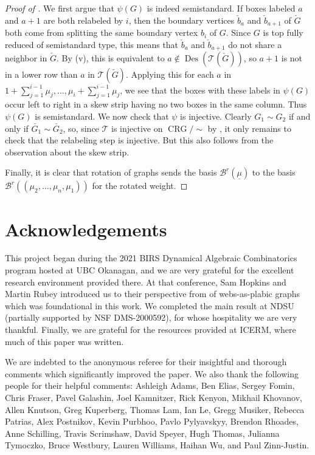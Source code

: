 \documentclass{amsart}
\theoremstyle{definition}
\theoremstyle{remark}
\numberwithin{equation}{section}
\DeclareMathOperator{\crg}{CRG}
\DeclareMathOperator{\Des}{Des}
\begin{document}
\begin{proof}[Proof of ]
    We first argue that $\psi(G)$ is indeed semistandard. If boxes labeled $a$ and $a+1$ are both relabeled by $i$, then the boundary vertices $\check{b}_a$ and $\check{b}_{a+1}$ of $\check{G}$ both come from splitting the same boundary vertex $b_i$ of $G$. Since $G$ is top fully reduced of semistandard type, this means that $\check{b}_a$ and $\check{b}_{a+1}$ do not share a neighbor in $\check{G}$. By (v), this is equivalent to $a \not \in \Des(\mathcal{T}(\check{G}))$, so $a+1$ is not in a lower row than $a$ in $\mathcal{T}(\check{G})$. Applying this for each $a$ in $1+\sum_{j=1}^{i-1} \mu_j, \ldots, \mu_i + \sum_{j=1}^{i-1} \mu_j$, we see that the boxes with these labels in $\psi(G)$ occur left to right in a skew strip having no two boxes in the same column. Thus $\psi(G)$ is semistandard. We now check that $\psi$ is injective. Clearly $G_1 \sim G_2$ if and only if $\check{G_1} \sim \check{G_2}$, so, since $\mathcal{T}$ is injective on $\crg/{\sim}$ by , it only remains to check that the relabeling step is injective. But this also follows from the observation about the skew strip.

    Finally, it is clear that rotation of graphs sends the basis $\mathscr{B}^r(\underline{\mu})$ to the basis $\mathscr{B}^r((\mu_2,\ldots,\mu_{n},\mu_1))$ for the rotated weight.
\end{proof}

\section*{Acknowledgements}
This project began during the 2021 BIRS Dynamical Algebraic Combinatorics program hosted at UBC Okanagan, and we are very grateful for the excellent research environment provided there. At that conference, Sam Hopkins and Martin Rubey introduced us to their perspective from \cite{Hopkins-Rubey} of webs-as-plabic graphs which was foundational in this work. We completed the main result at NDSU (partially supported by NSF DMS-2000592), for whose hospitality we are very thankful. Finally, we are grateful for the resources provided at ICERM, where much of this paper was written.

We are indebted to the anonymous referee for their insightful and thorough comments which significantly improved the paper. We also thank the following people for their helpful comments: Ashleigh Adams, Ben Elias, Sergey Fomin, Chris Fraser, Pavel Galashin, Joel Kamnitzer, Rick Kenyon, Mikhail Khovanov, Allen Knutson, Greg Kuperberg, Thomas Lam, Ian Le, Gregg Musiker, Rebecca Patrias, Alex Postnikov, Kevin Purbhoo, Pavlo Pylyavskyy, Brendon Rhoades, Anne Schilling, Travis Scrimshaw, David Speyer, Hugh Thomas, Julianna Tymoczko, Bruce Westbury, Lauren Williams, Haihan Wu, and Paul Zinn-Justin.



\end{document}
